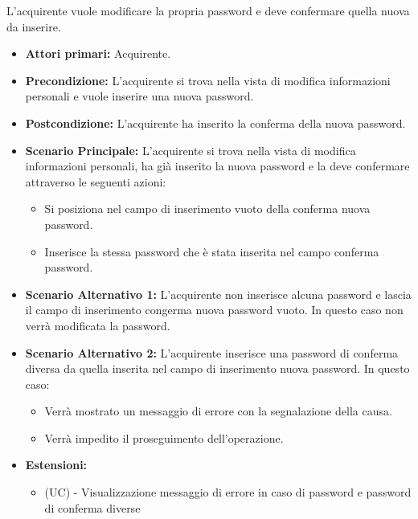 L'acquirente vuole modificare la propria password e deve confermare quella nuova da inserire.
\begin{itemize}
    \item \textbf{Attori primari:} Acquirente.
    \item \textbf{Precondizione:} L'acquirente si trova nella vista di modifica informazioni personali e vuole inserire una nuova password.
    \item \textbf{Postcondizione:} L'acquirente ha inserito la conferma della nuova password.
    \item \textbf{Scenario Principale:} L'acquirente si trova nella vista di modifica informazioni personali, ha già inserito la nuova password e la deve confermare attraverso le seguenti azioni:
        \begin{itemize}
            \item Si posiziona nel campo di inserimento vuoto della conferma nuova password.
            \item Inserisce la stessa password che è stata inserita nel campo conferma password.
        \end{itemize}
    \item \textbf{Scenario Alternativo 1:} L'acquirente non inserisce alcuna password e lascia il campo di inserimento congerma nuova password vuoto. In questo caso non verrà modificata la password.
    \item \textbf{Scenario Alternativo 2:} L'acquirente inserisce una password di conferma diversa da quella inserita nel campo di inserimento nuova password. In questo caso:
    \begin{itemize}
        \item Verrà mostrato un messaggio di errore con la segnalazione della causa.
        \item Verrà impedito il proseguimento dell'operazione.
    \end{itemize}
    \item \textbf{Estensioni:}
    \begin{itemize}
        \item (UC) - Visualizzazione messaggio di errore in caso di password e password di conferma diverse
    \end{itemize}
\end{itemize}


